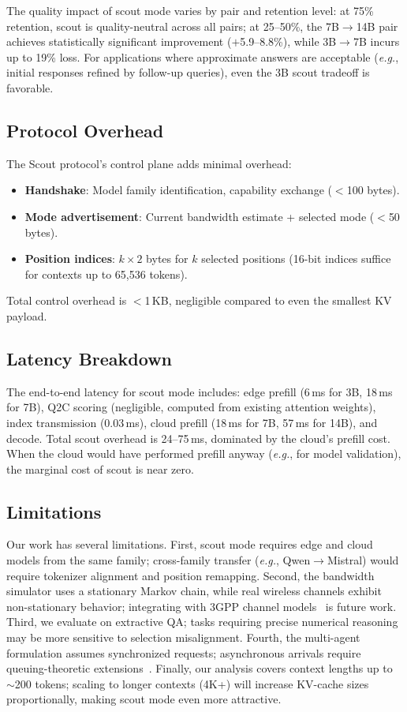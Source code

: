 \documentclass[conference]{IEEEtran}
\newcommand{\eg}{\textit{e.g.}\xspace}
\begin{document}
The quality impact of scout mode varies by pair and retention level: at 75\% retention, scout is quality-neutral across all pairs; at 25--50\%, the 7B$\to$14B pair achieves statistically significant improvement ($+$5.9--8.8\%), while 3B$\to$7B incurs up to 19\% loss.
For applications where approximate answers are acceptable (\eg, initial responses refined by follow-up queries), even the 3B scout tradeoff is favorable.

\subsection{Protocol Overhead}

The Scout protocol's control plane adds minimal overhead:
\begin{itemize}
    \item \textbf{Handshake}: Model family identification, capability exchange ($<$100 bytes).
    \item \textbf{Mode advertisement}: Current bandwidth estimate + selected mode ($<$50 bytes).
    \item \textbf{Position indices}: $k \times 2$ bytes for $k$ selected positions (16-bit indices suffice for contexts up to 65{,}536 tokens).
\end{itemize}
Total control overhead is $<$1\,KB, negligible compared to even the smallest KV payload.

\subsection{Latency Breakdown}

The end-to-end latency for scout mode includes: edge prefill (6\,ms for 3B, 18\,ms for 7B), Q2C scoring (negligible, computed from existing attention weights), index transmission (0.03\,ms), cloud prefill (18\,ms for 7B, 57\,ms for 14B), and decode.
Total scout overhead is 24--75\,ms, dominated by the cloud's prefill cost.
When the cloud would have performed prefill anyway (\eg, for model validation), the marginal cost of scout is near zero.

\subsection{Limitations}

Our work has several limitations.
First, scout mode requires edge and cloud models from the same family; cross-family transfer (\eg, Qwen$\to$Mistral) would require tokenizer alignment and position remapping.
Second, the bandwidth simulator uses a stationary Markov chain, while real wireless channels exhibit non-stationary behavior; integrating with 3GPP channel models~\cite{3gpp} is future work.
Third, we evaluate on extractive QA; tasks requiring precise numerical reasoning may be more sensitive to selection misalignment.
Fourth, the multi-agent formulation assumes synchronized requests; asynchronous arrivals require queuing-theoretic extensions~\cite{queuing}.
Finally, our analysis covers context lengths up to $\sim$200 tokens; scaling to longer contexts (4K+) will increase KV-cache sizes proportionally, making scout mode even more attractive.
\end{document}
